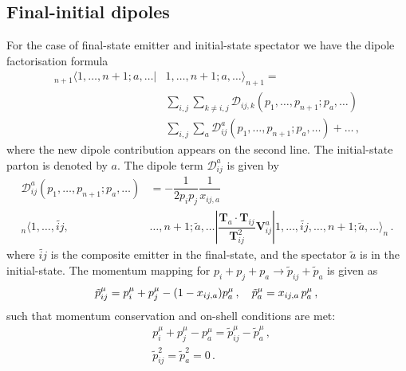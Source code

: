 \documentclass[main.tex]{subfiles}
\begin{document}
    \subsection{Final-initial dipoles}
        For the case of final-state emitter and initial-state
        spectator we have the dipole factorisation formula
        \begin{equation}\label{eqn:FI_factorisation}
            \begin{split}
                {}_{n+1}\langle 1, \ldots, n+1; a, \ldots |& 1, \ldots, n+1; a, \ldots \rangle_{n+1} = \\
                &\sum_{i,j}\sum_{k\neq i,j} \mathcal{D}_{ij,k}(p_{1},\ldots,p_{n+1};p_{a},\ldots) \\
                &\sum_{i,j}\sum_{a} \mathcal{D}_{ij}^{a}(p_{1},\ldots,p_{n+1};p_{a},\ldots) + \ldots \, ,
            \end{split}
        \end{equation}
        where the new dipole contribution appears on the second line.
        The initial-state parton is denoted by $a$.
        The dipole term $\mathcal{D}_{ij}^{a}$ is given by
        \begin{equation}\label{eqn:D_aij}
            \begin{split}
                \mathcal{D}_{ij}^{a}(p_{1}, \ldots, p_{n+1}; p_{a}, \ldots) &= -\dfrac{1}{2p_{i}p_{j}} \dfrac{1}{x_{ij,a}} \\
                {}_{n} \langle 1, \ldots, \widetilde{ij}, &\ldots, n+1; \tilde{a}, \ldots | \dfrac{\boldsymbol{T}_{a} \cdot \boldsymbol{T}_{ij}}{\boldsymbol{T}_{ij}^{2}} \boldsymbol{V}_{ij}^{a} | 1, \ldots, \widetilde{ij}, \ldots, n+1; \tilde{a} , \ldots \rangle_{n} \, .
            \end{split}
        \end{equation}
        where $\widetilde{ij}$ is the composite emitter in the
        final-state, and the spectator $\tilde{a}$ is in the initial-state.
        The momentum mapping for $p_{i} + p_{j} + p_{a} \rightarrow \tilde{p}_{ij} + \tilde{p}_{a}$ is given as
        \begin{equation}\label{eqn:FI_mapping}
            \tilde{p}_{ij}^{\mu} = p_{i}^{\mu} + p_{j}^{\mu} - (1-x_{ij,a})p_{a}^{\mu} \, , \quad \tilde{p}_{a}^{\mu} = x_{ij,a} \, p_{a}^{\mu} \, , \\
        \end{equation}
        such that momentum conservation and on-shell conditions are met:
        \begin{equation}\label{eqn:FI_mapping_conditions}
            \begin{split}
                &p_{i}^{\mu} + p_{j}^{\mu} - p_{a}^{\mu} = \tilde{p}_{ij}^{\mu} - \tilde{p}_{a}^{\mu} \, , \\
                &\tilde{p}_{ij}^{2} = \tilde{p}_{a}^{2} = 0 \, .
            \end{split}
        \end{equation}
\end{document}
